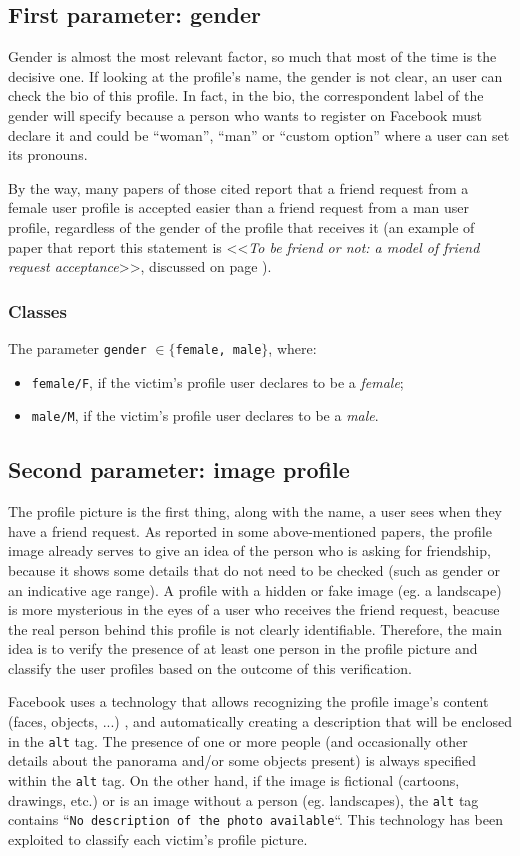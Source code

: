 \subsection{First parameter: gender}
Gender is almost the most relevant factor, so much that most of the time is the decisive one. If looking at the profile's name, the gender is not clear, an user can check the bio of this profile. In fact, in the bio, the correspondent label of the gender will specify because a person who wants to register on Facebook must declare it and could be ``woman'', ``man'' or ``custom option'' where a user can set its pronouns. \par \noindent 
By the way, many papers of those cited report that a friend request from a female user profile is accepted easier than a friend request from a man user profile, regardless of the gender of the profile that receives it (an example of paper that report this statement is <<\textit{To be friend or not: a model of friend request acceptance}>>\parencite{site:paper7}, discussed on page \pageref{cap:to-be-friend}).
\subsubsection*{Classes}
The parameter \texttt{gender} $ \in \{$\texttt{female, male}$\}$, where: 
\begin{itemize}
	\item \texttt{female/F}, if the victim's profile user declares to be a \textit{female};
	\item \texttt{male/M}, if the victim's profile user declares to be a \textit{male}.
\end{itemize}
\subsection{Second parameter: image profile}
\label{cap:alt-technology}
The profile picture is the first thing, along with the name, a user sees when they have a friend request. As reported in some above-mentioned papers, the profile image already serves to give an idea of the person who is asking for friendship, because it shows some details that do not need to be checked (such as gender or an indicative age range).
A profile with a hidden or fake image (eg. a landscape) is more mysterious in the eyes of a user who receives the friend request, beacuse the real person behind this profile is not clearly identifiable. Therefore, the main idea is to verify the presence of at least one person in the profile picture and classify the user profiles based on the outcome of this verification.\par \noindent 
Facebook uses a technology that allows recognizing the profile image's content (faces, objects, ...) \parencite{site:alt-text} , and automatically creating a description that will be enclosed in the \texttt{alt} tag. 
The presence of one or more people (and occasionally other details about the panorama and/or some objects present) is always specified within the \texttt{alt} tag. On the other hand, if the image is fictional (cartoons, drawings, etc.) or is an image without a person (eg. landscapes), the \texttt{alt} tag contains ``\texttt{No description of the photo available}``. This technology has been exploited to classify each victim's profile picture.
